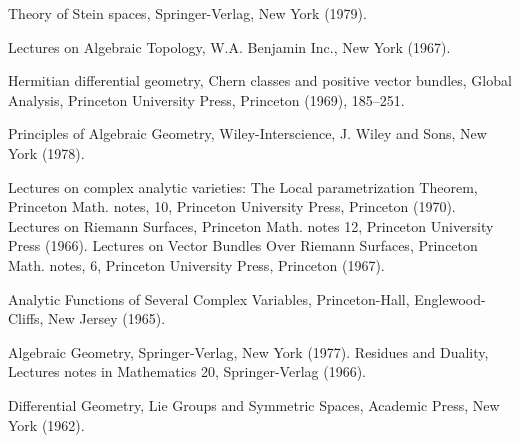 \begin{sourcebibliography}
 Theory of Stein spaces, Springer-Verlag, New York (1979).
\end{sourcebibliography}
\begin{sourcebibliography}
 Lectures on Algebraic Topology, W.A. Benjamin Inc., New York (1967).
\end{sourcebibliography}
\begin{sourcebibliography}
 Hermitian differential geometry, Chern classes and positive vector bundles, Global Analysis, Princeton University Press, Princeton (1969), 185--251.
\end{sourcebibliography}
\begin{sourcebibliography}
 Principles of Algebraic Geometry, Wiley-Interscience, J. Wiley and Sons, New York (1978).
\end{sourcebibliography}
\begin{sourcebibliography}
 Lectures on complex analytic varieties: The Local parametrization Theorem, Princeton Math. notes, 10, Princeton University Press, Princeton (1970).
 Lectures on Riemann Surfaces, Princeton Math. notes 12, Princeton University Press (1966).
 Lectures on Vector Bundles Over Riemann Surfaces, Princeton Math. notes, 6, Princeton University Press, Princeton (1967).
\end{sourcebibliography}
\begin{sourcebibliography}
 Analytic Functions of Several Complex Variables, Princeton-Hall, Englewood-Cliffs, New Jersey (1965).
\end{sourcebibliography}
\begin{sourcebibliography}
 Algebraic Geometry, Springer-Verlag, New York (1977).
 Residues and Duality, Lectures notes in Mathematics 20, Springer-Verlag (1966).
\end{sourcebibliography}
\begin{sourcebibliography}
 Differential Geometry, Lie Groups and Symmetric Spaces, Academic Press, New York (1962).
\end{sourcebibliography}
